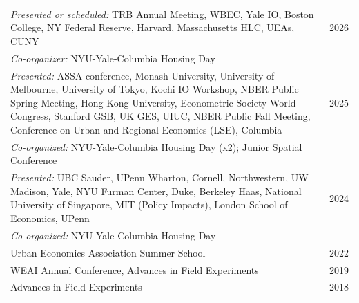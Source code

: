 \documentclass[10pt]{article}
\renewcommand{\section}[1]{\pagebreak[3]%
    \vspace{1.3\baselineskip}%
    \phantomsection\addcontentsline{toc}{section}{#1}%
    \noindent\llap{\scshape\smash{\parbox[t]{\marginparwidth}{\hyphenpenalty=10000\raggedright #1}}}%
    \vspace{-\baselineskip}\par}
\begin{document}
\hspace*{-0.75em}\begin{tabular}{p{12cm}r} 
    \vspace{-0.3em}
    \emph{Presented or scheduled:} TRB Annual Meeting, WBEC, Yale IO, Boston College, NY Federal Reserve, Harvard, Massachusetts HLC, UEAs, CUNY & 2026 \\ [2em]
    \emph{Co-organizer:} NYU-Yale-Columbia Housing Day\\[1em]

    \emph{Presented:} ASSA conference, Monash University, University of Melbourne, University of Tokyo, Kochi IO Workshop, NBER Public Spring Meeting, Hong Kong University, Econometric Society World Congress, Stanford GSB, UK GES, UIUC, NBER Public Fall Meeting, Conference on Urban and Regional Economics (LSE), Columbia & 2025 \\ [5em]
    \emph{Co-organized:} NYU-Yale-Columbia Housing Day (x2); Junior Spatial Conference \\[1em]
    
    \emph{Presented:} UBC Sauder, UPenn Wharton, Cornell, Northwestern, UW Madison, Yale, NYU Furman Center, Duke, Berkeley Haas, National University of Singapore, MIT (Policy Impacts), London School of Economics, UPenn  & 2024 \\[2.7em]
    \emph{Co-organized:} NYU-Yale-Columbia Housing Day \\[1em]
    
    Urban Economics Association Summer School & 2022 \\[0.3em] 
    WEAI Annual Conference, Advances in Field Experiments & 2019 \\[0.3em] 
    Advances in Field Experiments & 2018 \\

\end{tabular}

\end{document}
